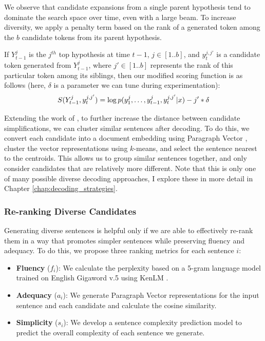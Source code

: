 \documentclass[thesis.tex]{subfiles}
\begin{document}
We observe that candidate expansions from a single parent hypothesis tend to dominate the search space over time, even with a large beam. To increase diversity, we apply a penalty term based on the rank of a generated token among the $b$ candidate tokens from its parent hypothesis.

If $Y^j_{t-1}$ is the $j^{th}$ top hypothesis at time $t-1$, $j\in[1..b]$, and $y_t^{j,j'}$ is a candidate token generated from $Y^j_{t-1}$, where $j'\in[1..b]$ represents the rank of this particular token among its siblings, then our modified scoring function is as follows (here, $\delta$ is a parameter we can tune during experimentation):
\begin{equation}
\small
S(Y_{t-1}^j,y_t^{j,j'})=\log{p(y_1^j,\dots,y_{t-1}^j,y_t^{j,j'}|x)}-j'*\delta
\end{equation}

Extending the work of \cite{li2016simple}, to further increase the distance between candidate simplifications, we can cluster similar sentences after decoding. To do this, we convert each candidate into a document embedding using Paragraph Vector \citep{le2014distributed}, cluster the vector representations using $k$-means, and select the sentence nearest to the centroids. This allows us to group similar sentences together, and only consider candidates that are relatively more different. Note that this is only one of many possible diverse decoding approaches, I explore these in more detail in Chapter \ref{chap:decoding_strategies}.

\subsubsection{Re-ranking Diverse Candidates}

Generating diverse sentences is helpful only if we are able to effectively re-rank them in a way that promotes simpler sentences while preserving fluency and adequacy. To do this, we propose three ranking metrics for each sentence $i$:

\begin{itemize}
    \item \textbf{Fluency} ($f_i$): We calculate the perplexity based on a 5-gram language model trained on English Gigaword v.5 \citep{parker2011english} using KenLM \citep{heafield2011kenlm}.
    \item \textbf{Adequacy} ($a_i$): We generate Paragraph Vector representations \cite{le2014distributed} for the input sentence and each candidate and calculate the cosine similarity.
    \item \textbf{Simplicity} ($s_i$): We develop a sentence complexity prediction model to predict the overall complexity of each sentence we generate.
\end{itemize}
\end{document}
